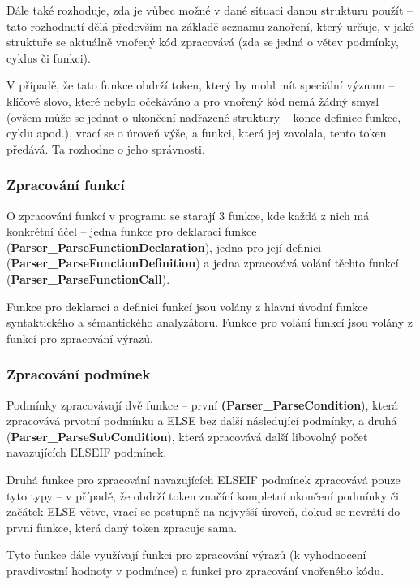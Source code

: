 \documentclass[a4paper,11pt]{article}
\begin{document}
\vspace{2mm}
Dále také rozhoduje, zda je vůbec možné v dané situaci danou strukturu použít – tato rozhodnutí dělá především na základě seznamu zanoření, který určuje, v jaké struktuře se aktuálně vnořený kód zpracovává (zda se jedná o větev podmínky, cyklus či funkci).

\vspace{2mm}
V případě, že tato funkce obdrží token, který by mohl mít speciální význam – klíčové slovo, které nebylo očekáváno a pro vnořený kód nemá žádný smysl (ovšem může se jednat o ukončení nadřazené struktury – konec definice funkce, cyklu apod.), vrací se o úroveň výše, a funkci, která jej zavolala, tento token předává. Ta rozhodne o jeho správnosti.

\subsubsection{Zpracování funkcí} \label{syse-reseni-funkce}
O zpracování funkcí v programu se starají 3 funkce, kde každá z nich má konkrétní účel – jedna funkce pro deklaraci funkce (\textbf{Parser\_ParseFunctionDeclaration}), jedna pro její definici (\textbf{Parser\_ParseFunctionDefinition}) a jedna zpracovává volání těchto funkcí (\textbf{Parser\_ParseFunctionCall}).

\vspace{2mm}
Funkce pro deklaraci a definici funkcí jsou volány z hlavní úvodní funkce syntaktického a sémantického analyzátoru. Funkce pro volání funkcí jsou volány z funkcí pro zpracování výrazů.

\subsubsection{Zpracování podmínek} \label{syse-reseni-podminky}
Podmínky zpracovávají dvě funkce – první \textbf{(Parser\_ParseCondition}), která zpracovává prvotní podmínku a \textsf{ELSE} bez další následující podmínky, a druhá (\textbf{Parser\_ParseSubCondition}), která zpracovává další libovolný počet navazujících \textsf{ELSEIF} podmínek.

\vspace{2mm}
Druhá funkce pro zpracování navazujících \textsf{ELSEIF} podmínek zpracovává pouze tyto typy – v případě, že obdrží token značící kompletní ukončení podmínky či začátek \textsf{ELSE} větve, vrací se postupně na nejvyšší úroveň, dokud se nevrátí do první funkce, která daný token zpracuje sama.

\vspace{2mm}
Tyto funkce dále využívají funkci pro zpracování výrazů (k vyhodnocení pravdivostní hodnoty v podmínce) a funkci pro zpracování vnořeného kódu.
\end{document}
